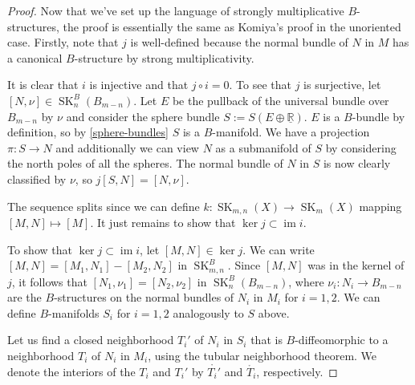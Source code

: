 \documentclass[10pt,a4paper]{amsart}
\newcommand{\R}{\mathbb{R}}
\newcommand{\SK}{\operatorname{SK}}
\newcommand{\im}{\operatorname{im}}
\begin{document}
\begin{proof}
    Now that we've set up the language of strongly multiplicative $B$-structures, the proof is essentially the same as Komiya's proof in the unoriented case. Firstly, note that $j$ is well-defined because the normal bundle of $N$ in $M$ has a canonical $B$-structure by strong multiplicativity.

    It is clear that $i$ is injective and that $j\circ i = 0$. To see that $j$ is surjective, let $[N,\nu]\in\SK_n^B(B_{m-n})$. Let $E$ be the pullback of the universal bundle over $B_{m-n}$ by $\nu$ and consider the sphere bundle $S:=S(E\oplus\underline{\R})$. $E$ is a $B$-bundle by definition, so by \cref{sphere-bundles} $S$ is a $B$-manifold. We have a projection $\pi:S\to N$ and additionally we can view $N$ as a submanifold of $S$ by considering the north poles of all the spheres. The normal bundle of $N$ in $S$ is now clearly classified by $\nu$, so $j[S,N] = [N,\nu]$.
    
    The sequence splits since we can define $k:\SK_{m,n}(X)\to \SK_m(X)$ mapping $[M,N] \mapsto [M]$. It just remains to show that $\ker j \subset \im i$.
    
    To show that $\ker j \subset \im i$, let $[M,N]\in\ker j$. We can write $[M,N] = [M_1,N_1] - [M_2, N_2]$ in $\SK_{m,n}^B$. Since $[M,N]$ was in the kernel of $j$, it follows that $[N_1,\nu_1] = [N_2,\nu_2]$ in $\SK_n^B(B_{m-n})$, where $\nu_i:N_i \to B_{m-n}$ are the $B$-structures on the normal bundles of $N_i$ in $M_i$ for $i=1,2$. We can define $B$-manifolds $S_i$ for $i=1,2$ analogously to $S$ above.

    Let us find a closed neighborhood $T_i'$ of $N_i$ in $S_i$ that is $B$-diffeomorphic to a neighborhood $T_i$ of $N_i$ in $M_i$, using the tubular neighborhood theorem. We denote the interiors of the $T_i$ and $T_i'$ by $\mathring{T_i'}$ and $\mathring{T_i}$, respectively.


\end{proof}
\end{document}
